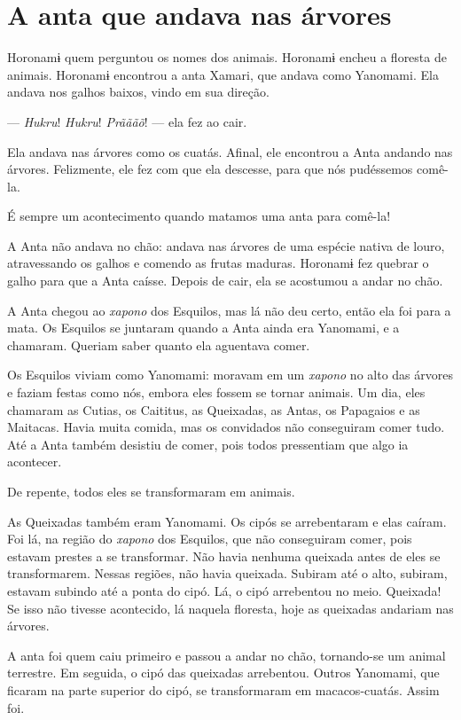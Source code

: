  \chapter{A anta que andava nas árvores}
 
 Horonamɨ quem perguntou os nomes dos animais. Horonamɨ encheu a
floresta de animais. 
Horonamɨ encontrou a anta Xamari, que andava como Yanomami. Ela andava
nos galhos baixos, vindo em sua direção. 

--- \textit{Hukru}! \textit{Hukru}! \textit{Prãããõ}! --- ela fez ao cair. 

Ela andava nas árvores como os cuatás. Afinal, ele encontrou a Anta
andando nas árvores. Felizmente, ele fez com que ela descesse, para que
nós pudéssemos comê-la. 

É sempre um acontecimento quando matamos uma anta para comê-la! 

A Anta não andava no chão: andava nas árvores de uma espécie nativa de
louro, atravessando os galhos e comendo as frutas maduras. Horonamɨ fez
quebrar o galho para que a Anta caísse. Depois de cair, ela se acostumou
a andar no chão. 

A Anta chegou ao \textit{xapono} dos Esquilos, mas lá não deu certo, então ela
foi para a mata. Os Esquilos se juntaram quando a Anta ainda era Yanomami,
e a chamaram. Queriam saber quanto ela aguentava comer.

Os Esquilos viviam como Yanomami: moravam em um \textit{xapono} no alto das
 árvores e faziam festas como nós, embora eles fossem se tornar animais.
 Um dia, eles chamaram as Cutias, os Caititus, as Queixadas, as Antas, os
 Papagaios e as Maitacas. Havia muita comida, mas os convidados não
 conseguiram comer tudo. Até a Anta também desistiu de comer, pois
 todos pressentiam que algo ia acontecer.

De repente, todos eles se transformaram em animais. 

As Queixadas também eram Yanomami. Os cipós se
arrebentaram e elas caíram. Foi lá, na região do \textit{xapono} dos Esquilos,
que não conseguiram comer, pois estavam prestes a se transformar. Não
havia nenhuma queixada antes de eles se transformarem. Nessas regiões,
não havia queixada. Subiram até o alto, subiram, estavam subindo até a
ponta do cipó. Lá, o cipó arrebentou no meio. Queixada! Se isso não
tivesse acontecido, lá naquela floresta, hoje as queixadas andariam nas
árvores.

A anta foi quem caiu primeiro e passou a andar no chão, tornando-se um
animal terrestre. Em seguida, o cipó das queixadas arrebentou. Outros
Yanomami, que ficaram na parte superior do cipó, se transformaram em
macacos-cuatás. Assim foi.

